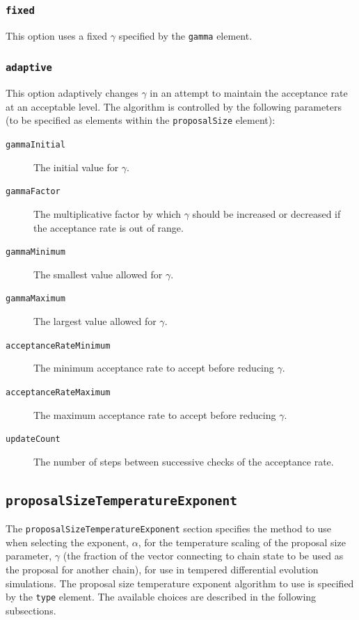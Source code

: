 \subsubsection{{\tt fixed}}

This option uses a fixed $\gamma$ specified by the {\tt gamma} element.

\subsubsection{{\tt adaptive}}

This option adaptively changes $\gamma$ in an attempt to maintain the acceptance rate at an acceptable level. The algorithm is controlled by the following parameters (to be specified as elements within the {\tt proposalSize} element):
\begin{description}
\item[{\tt gammaInitial}] The initial value for $\gamma$.
\item[{\tt gammaFactor}] The multiplicative factor by which $\gamma$ should be increased or decreased if the acceptance rate is out of range.
\item[{\tt gammaMinimum}] The smallest value allowed for $\gamma$.
\item[{\tt gammaMaximum}] The largest value allowed for $\gamma$.
\item[{\tt acceptanceRateMinimum}] The minimum acceptance rate to accept before reducing $\gamma$.
\item[{\tt acceptanceRateMaximum}] The maximum acceptance rate to accept before reducing $\gamma$.
\item[{\tt updateCount}] The number of steps between successive checks of the acceptance rate.
\end{description}

\subsection{{\tt proposalSizeTemperatureExponent}}

The {\tt proposalSizeTemperatureExponent} section specifies the method to use when selecting the exponent, $\alpha$, for the temperature scaling of the proposal size parameter, $\gamma$ (the fraction of the vector connecting to chain state to be used as the proposal for another chain), for use in tempered differential evolution simulations. The proposal size temperature exponent algorithm to use is specified by the {\tt type} element. The available choices are described in the following subsections.

